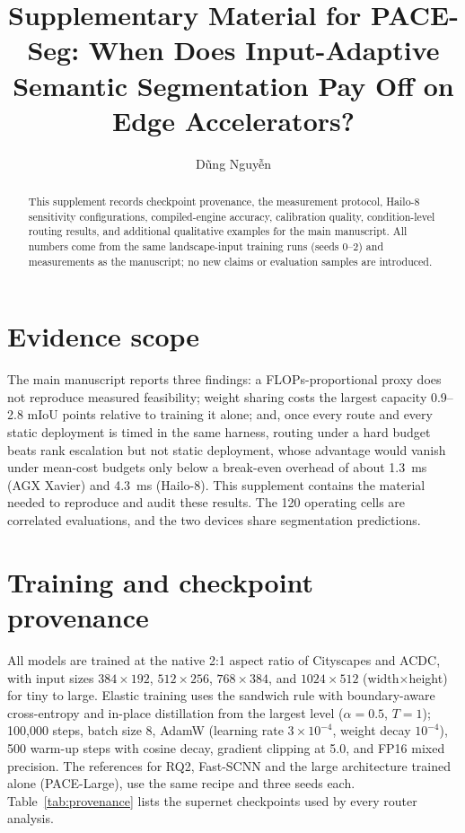 \documentclass[a4paper,review,12pt]{elsarticle}
\newcommand{\miou}{mIoU}
\begin{document}
\begin{frontmatter}
\title{Supplementary Material for PACE-Seg: When Does Input-Adaptive Semantic Segmentation Pay Off on Edge Accelerators?}
\author{D\~ung Nguy\~{\^e}n}
\begin{abstract}
This supplement records checkpoint provenance, the measurement protocol, Hailo-8 sensitivity configurations, compiled-engine accuracy, calibration quality, condition-level routing results, and additional qualitative examples for the main manuscript. All numbers come from the same landscape-input training runs (seeds 0--2) and measurements as the manuscript; no new claims or evaluation samples are introduced.
\end{abstract}
\end{frontmatter}

\section{Evidence scope}

The main manuscript reports three findings: a FLOPs-proportional proxy does not reproduce measured feasibility; weight sharing costs the largest capacity 0.9--2.8 \miou{} points relative to training it alone; and, once every route and every static deployment is timed in the same harness, routing under a hard budget beats rank escalation but not static deployment, whose advantage would vanish under mean-cost budgets only below a break-even overhead of about 1.3~ms (AGX Xavier) and 4.3~ms (Hailo-8). This supplement contains the material needed to reproduce and audit these results. The 120 operating cells are correlated evaluations, and the two devices share segmentation predictions.

\section{Training and checkpoint provenance}

All models are trained at the native 2:1 aspect ratio of Cityscapes and ACDC, with input sizes $384\times192$, $512\times256$, $768\times384$, and $1024\times512$ (width$\times$height) for tiny to large. Elastic training uses the sandwich rule with boundary-aware cross-entropy and in-place distillation from the largest level ($\alpha=0.5$, $T=1$); 100,000 steps, batch size 8, AdamW (learning rate $3\times10^{-4}$, weight decay $10^{-4}$), 500 warm-up steps with cosine decay, gradient clipping at 5.0, and FP16 mixed precision. The references for RQ2, Fast-SCNN and the large architecture trained alone (PACE-Large), use the same recipe and three seeds each. Table~\ref{tab:provenance} lists the supernet checkpoints used by every router analysis.
\end{document}
